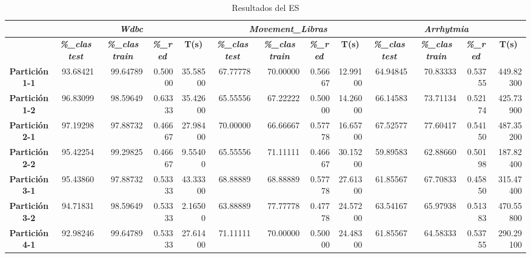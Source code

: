\documentclass[a4paper,11pt]{article}
\begin{document}
    
   \begin{table}[htbp]	
    \caption*{Resultados del ES}
    \begin{adjustbox}{width=1.1\textwidth}
    \begin{tabular}{|c|r|r|r|r|r|r|r|r|r|r|r|r|}
    \hline
    \multicolumn{1}{|l|}{} & \multicolumn{ 4}{c|}{\textbf{\textit{Wdbc}}} & \multicolumn{ 4}{c|}{\textbf{\textit{Movement\_Libras}}} & \multicolumn{ 4}{c|}{\textbf{\textit{Arrhytmia}}} \\ \hline
    & \multicolumn{1}{c|}{\textbf{\textit{\%\_clas test}}} & \multicolumn{1}{c|}{\textbf{\textit{\%\_clas train}}} & \multicolumn{1}{c|}{\textbf{\textit{\%\_red}}} & \multicolumn{1}{c|}{\textbf{T(s)}} & \multicolumn{1}{c|}{\textbf{\textit{\%\_clas test}}} & \multicolumn{1}{c|}{\textbf{\textit{\%\_clas train}}} & \multicolumn{1}{c|}{\textbf{\textit{\%\_red}}} & \multicolumn{1}{c|}{\textbf{T(s)}} & \multicolumn{1}{c|}{\textbf{\textit{\%\_clas test}}} & \multicolumn{1}{c|}{\textbf{\textit{\%\_clas train}}} & \multicolumn{1}{c|}{\textbf{\textit{\%\_red}}} & \multicolumn{1}{c|}{\textbf{T(s)}} \\ \hline
    \textbf{Partición 1-1} & 93.68421 & 99.64789 & 0.50000 & 35.58500 & 67.77778 & 70.00000 & 0.56667 & 12.99100 & 64.94845 & 70.83333 & 0.53755 & 449.82300 \\ \hline
    \textbf{Partición 1-2} & 96.83099 & 98.59649 & 0.63333 & 35.42600 & 65.55556 & 67.22222 & 0.50000 & 14.26000 & 66.14583 & 73.71134 & 0.52174 & 425.73900 \\ \hline
    \textbf{Partición 2-1} & 97.19298 & 97.88732 & 0.46667 & 27.98400 & 70.00000 & 66.66667 & 0.57778 & 16.65700 & 67.52577 & 77.60417 & 0.54150 & 487.35200 \\ \hline
    \textbf{Partición 2-2} & 95.42254 & 99.29825 & 0.46667 & 9.55400 & 65.55556 & 71.11111 & 0.46667 & 30.15200 & 59.89583 & 62.88660 & 0.50198 & 187.82400 \\ \hline
    \textbf{Partición 3-1} & 95.43860 & 97.88732 & 0.53333 & 43.33300 & 68.88889 & 68.88889 & 0.57778 & 27.61300 & 61.85567 & 67.70833 & 0.45850 & 315.47400 \\ \hline
    \textbf{Partición 3-2} & 94.71831 & 98.59649 & 0.53333 & 2.16500 & 63.88889 & 77.77778 & 0.47778 & 24.57200 & 63.54167 & 65.97938 & 0.51383 & 470.55800 \\ \hline
    \textbf{Partición 4-1} & 92.98246 & 99.64789 & 0.53333 & 27.61400 & 71.11111 & 70.00000 & 0.50000 & 24.48300 & 61.85567 & 64.58333 & 0.53755 & 290.29100 \\ \hline

\end{tabular}
\end{adjustbox}
\end{table}
\end{document}
